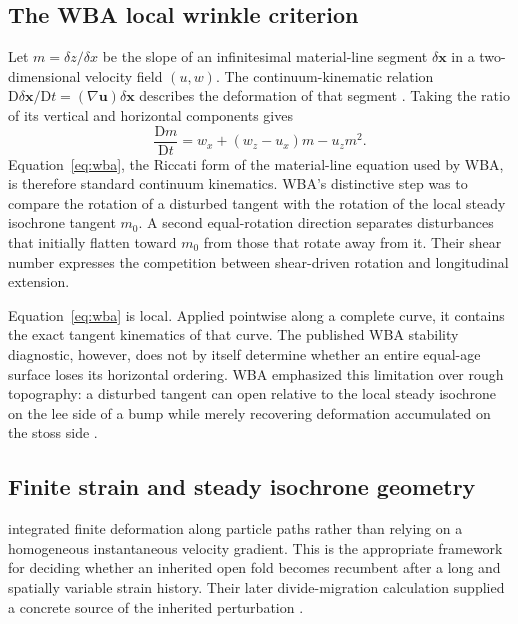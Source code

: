 \documentclass[review]{igs}
\newcommand{\parencite}{\citep}
\newcommand{\textcite}{\citet}
\theoremstyle{definition}
\theoremstyle{remark}
\newcommand{\uvec}{\bm{u}}
\begin{document}
\subsection{The WBA local wrinkle criterion}

Let \(m=\delta z/\delta x\) be the slope of an infinitesimal material-line segment \(\delta\bm{x}\) in a two-dimensional velocity field \((u,w)\). The continuum-kinematic relation \(\mathrm{D}\delta\bm{x}/\mathrm{D}t=(\nabla\uvec)\delta\bm{x}\) describes the deformation of that segment \parencite{GurtinFriedAnand2010}. Taking the ratio of its vertical and horizontal components gives
\begin{equation}
\frac{\mathrm{D}m}{\mathrm{D}t}
= w_x+(w_z-u_x)m-u_zm^2.
\label{eq:wba}
\end{equation}
Equation~\eqref{eq:wba}, the Riccati form of the material-line equation used by WBA, is therefore standard continuum kinematics. WBA's distinctive step was to compare the rotation of a disturbed tangent with the rotation of the local steady isochrone tangent \(m_0\). A second equal-rotation direction separates disturbances that initially flatten toward \(m_0\) from those that rotate away from it. Their shear number expresses the competition between shear-driven rotation and longitudinal extension.

Equation~\eqref{eq:wba} is local. Applied pointwise along a complete curve, it contains the exact tangent kinematics of that curve. The published WBA stability diagnostic, however, does not by itself determine whether an entire equal-age surface loses its horizontal ordering. WBA emphasized this limitation over rough topography: a disturbed tangent can open relative to the local steady isochrone on the lee side of a bump while merely recovering deformation accumulated on the stoss side \parencite{Waddington2001}.

\subsection{Finite strain and steady isochrone geometry}

\textcite{JacobsonWaddington2004} integrated finite deformation along particle paths rather than relying on a homogeneous instantaneous velocity gradient. This is the appropriate framework for deciding whether an inherited open fold becomes recumbent after a long and spatially variable strain history. Their later divide-migration calculation supplied a concrete source of the inherited perturbation \parencite{JacobsonWaddington2005}.
\end{document}
